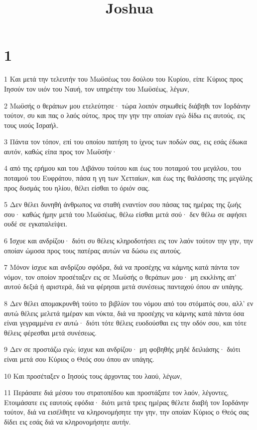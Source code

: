 

\title{Joshua}


\chapter{1}

\par 1 Και μετά την τελευτήν του Μωϋσέως του δούλου του Κυρίου, είπε Κύριος προς Ιησούν τον υιόν του Ναυή, τον υπηρέτην του Μωϋσέως, λέγων,
\par 2 Μωϋσής ο θεράπων μου ετελεύτησε· τώρα λοιπόν σηκωθείς διάβηθι τον Ιορδάνην τούτον, συ και πας ο λαός ούτος, προς την γην την οποίαν εγώ δίδω εις αυτούς, εις τους υιούς Ισραήλ.
\par 3 Πάντα τον τόπον, επί του οποίου πατήση το ίχνος των ποδών σας, εις εσάς έδωκα αυτόν, καθώς είπα προς τον Μωϋσήν·
\par 4 από της ερήμου και του Λιβάνου τούτου και έως του ποταμού του μεγάλου, του ποταμού του Ευφράτου, πάσα η γη των Χετταίων, και έως της θαλάσσης της μεγάλης προς δυσμάς του ηλίου, θέλει είσθαι το όριόν σας.
\par 5 Δεν θέλει δυνηθή άνθρωπος να σταθή εναντίον σου πάσας τας ημέρας της ζωής σου· καθώς ήμην μετά του Μωϋσέως, θέλω είσθαι μετά σού· δεν θέλω σε αφήσει ουδέ σε εγκαταλείψει.
\par 6 Ίσχυε και ανδρίζου· διότι συ θέλεις κληροδοτήσει εις τον λαόν τούτον την γην, την οποίαν ώμοσα προς τους πατέρας αυτών να δώσω εις αυτούς.
\par 7 Μόνον ίσχυε και ανδρίζου σφόδρα, διά να προσέχης να κάμνης κατά πάντα τον νόμον, τον οποίον προσέταξεν εις σε Μωϋσής ο θεράπων μου· μη εκκλίνης απ' αυτού δεξιά ή αριστερά, διά να φέρησαι μετά συνέσεως πανταχού όπου αν υπάγης.
\par 8 Δεν θέλει απομακρυνθή τούτο το βιβλίον του νόμου από του στόματός σου, αλλ' εν αυτώ θέλεις μελετά ημέραν και νύκτα, διά να προσέχης να κάμνης κατά πάντα όσα είναι γεγραμμένα εν αυτώ· διότι τότε θέλεις ευοδούσθαι εις την οδόν σου, και τότε θέλεις φέρεσθαι μετά συνέσεως.
\par 9 Δεν σε προστάζω εγώ; ίσχυε και ανδρίζου· μη φοβηθής μηδέ δειλιάσης· διότι είναι μετά σου Κύριος ο Θεός σου όπου αν υπάγης.
\par 10 Και προσέταξεν ο Ιησούς τους άρχοντας του λαού, λέγων,
\par 11 Περάσατε διά μέσου του στρατοπέδου και προστάξατε τον λαόν, λέγοντες, Ετοιμάσατε εις εαυτούς εφόδια· διότι μετά τρεις ημέρας θέλετε διαβή τον Ιορδάνην τούτον, διά να εισέλθητε να κληρονομήσητε την γην, την οποίαν Κύριος ο Θεός σας δίδει εις εσάς διά να κληρονομήσητε αυτήν.
